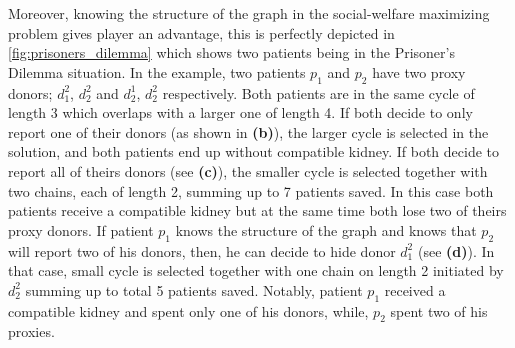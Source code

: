 Moreover, knowing the structure of the graph in the social-welfare maximizing problem gives player an advantage, this is perfectly depicted in \autoref{fig:prisoners_dilemma} which shows two patients being in the Prisoner's Dilemma situation. In the example, two patients $p_1$ and $p_2$ have two proxy donors; $d_1^2$, $d_2^2$ and $d_2^1$, $d_2^2$ respectively. Both patients are in the same cycle of length 3 which overlaps with a larger one of length 4. If both decide to only report one of their donors (as shown in \textbf{(b)}), the larger cycle is selected in the solution, and both patients end up without compatible kidney. If both decide to report all of theirs donors (see \textbf{(c)}), the smaller cycle is selected together with two chains, each of length 2, summing up to 7 patients saved. In this case both patients receive a compatible kidney but at the same time both lose two of theirs proxy donors. If patient $p_1$ knows the structure of the graph and knows that $p_2$ will report two of his donors, then, he can decide to hide donor $d_1^2$ (see \textbf{(d)}). In that case, small cycle is selected together with one chain on length 2 initiated by $d_2^2$ summing up to total 5 patients saved. Notably, patient $p_1$ received a compatible kidney and spent only one of his donors, while, $p_2$ spent two of his proxies.


